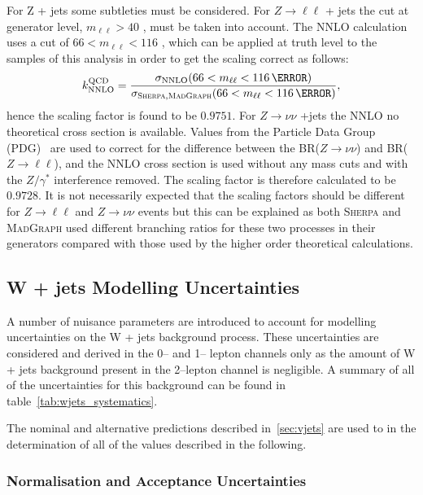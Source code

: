 For Z + jets some subtleties must be considered. For $Z \to \ell\ell$ + jets the
cut at generator level, $m_{\ell\ell}>40$ \GeV, must be taken into account. The
NNLO calculation uses a cut of $66<m_{\ell\ell}<116$ \GeV, which can be applied
at truth level to the samples of this analysis in order to get the scaling
correct as follows:
\begin{equation}
  k_{\text{NNLO}}^{\text{QCD}} = \frac{\sigma_{\text{NNLO}}(66<m_{\ell\ell}<116\,{\GeV})}{\sigma_{\textsc{Sherpa},\textsc{MadGraph}}(66<m_{\ell\ell}<116\,{\GeV})},
  \label{eq:nnlo-vjets-k}
\end{equation}
hence the scaling factor is found to be $0.9751$. For $Z \to \nu\nu$ +jets the
NNLO no theoretical cross section is available. Values from the
Particle Data Group (PDG)~\cite{PDG} are used to correct for the difference
between the BR($Z \to \nu\nu$) and BR($Z \to \ell\ell$), and the NNLO cross
section is used without any mass cuts and with the $Z/\gamma^*$ interference
removed. The scaling factor is therefore calculated to be $0.9728$. It is not
necessarily expected that the scaling factors should be different for $Z \to
\ell \ell$ and $Z \to \nu \nu$ events but this can be explained as both
\textsc{Sherpa} and \textsc{MadGraph} used different branching ratios for these
two processes in their generators compared with those used by the higher order
theoretical calculations.

\subsection{W + jets Modelling Uncertainties}
A number of nuisance parameters are introduced to account for modelling
uncertainties on the W + jets background process. These uncertainties are
considered and derived in the 0-- and 1-- lepton channels only as the amount of
W + jets background present in the 2--lepton channel is negligible. A summary of
all of the uncertainties for this background can be found in
table~\ref{tab:wjets_systematics}.

The nominal and alternative predictions described in~\ref{sec:vjets} are used to
in the determination of all of the values described in the following. 

\subsubsection{Normalisation and Acceptance Uncertainties}

